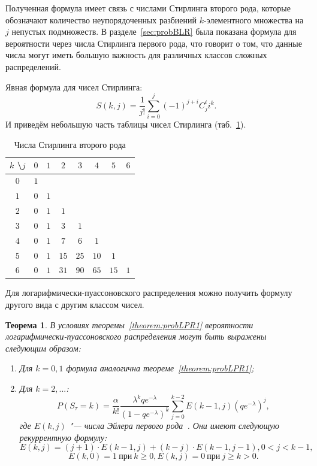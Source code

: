 \documentclass[12pt, specialist, subf, substylefile = spbu_report.rtx]{disser}
\newtheorem{theorem}{Теорема}
\begin{document}
	Полученная формула имеет связь с числами Стирлинга второго рода, которые обозначают количество неупорядоченных разбиений $k$-элементного множества на $j$ непустых подмножеств. В разделе~\ref{sec:probBLR} была показана формула для вероятности через числа Стирлинга первого рода, что говорит о том, что данные числа могут иметь большую важность для различных классов сложных распределений. 
	
	Явная формула для чисел Стирлинга:
	\[
	S(k, j) = \frac {1} {j!} \sum \limits _{i = 0} ^j (-1) ^{j + i} C _{j} ^{i} i ^k.
	\]
	И приведём небольшую часть таблицы чисел Стирлинга (таб.~\ref{tab:stirling2}).
	\begin{table}[!h]
		\centering
		\caption{Числа Стирлинга второго рода}
		\begin{tabular}{c|ccccccc}
			$k$ \textbackslash $j$ & $0$ & $1$ & $2$ & $3$ & $4$ & $5$ & $6$\\ \hline
			$0$ & $1$ &   &  &  & &  &\\
			$1$ & $0$ & $1$ &  &  & &  &\\
			$2$ & $0$ & $1$ & $1$ &  & &  &\\
			$3$ & $0$ & $1$ & $3$ & $1$ &  & &\\
			$4$ & $0$ & $1$ & $7$ &  $6$ & $1$ & & \\
			$5$ & $0$ & $1$ & $15$ & $25$ & $10$ & $1$ & \\
			$6$ & $0$ & $1$ & $31$ & $90$ & $65$ & $15$ & $1$
		\end{tabular}
		\label{tab:stirling2}
	\end{table}
	
	Для логарифмически-пуассоновского распределения можно получить формулу другого вида с другим классом чисел.
	
	\begin{theorem}
		\label{theorem:probLPR2}
		В условиях теоремы~\ref{theorem:probLPR1} вероятности логарифмически-пуассоновского распределения могут быть выражены следующим образом:
		\begin{enumerate}
			\item Для $k = 0, 1$ формула аналогична теореме~\ref{theorem:probLPR1};
			
			\item Для $k = 2, ...$:
			\begin{equation}\label{lpr:prob2}
				P(S _\tau = k) = \frac \alpha {k !} \frac {\lambda ^k q e ^{-\lambda}} {\left(1 - q e ^{-\lambda}\right) ^k} \sum \limits _{j = 0} ^{k - 2} E(k - 1, j) \left(q e ^{-\lambda}\right) ^j, 
			\end{equation}
			где $E(k, j)$ "--- числа Эйлера первого рода~\cite{bib:knuth1998}. Они имеют следующую рекуррентную формулу:
			\[
				E(k, j) = (j + 1) \cdot E(k - 1, j) + (k - j) \cdot E(k - 1, j - 1), 0 < j < k - 1,
			\]
			\[
				E(k, 0) = 1~ \text{при}~ k \geqslant 0, E(k, j) = 0~ \text{при}~ j \geqslant k > 0.
			\]
		\end{enumerate}
	\end{theorem}
	
\end{document}
